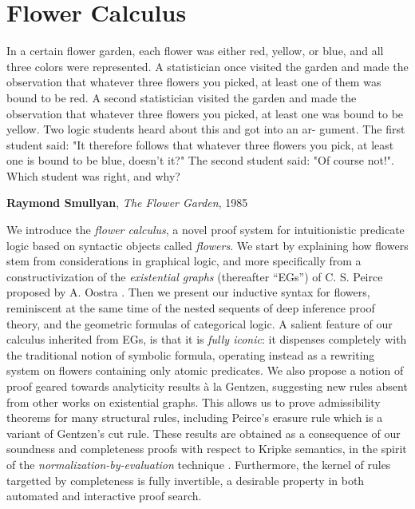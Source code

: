 \setchapterpreamble[u]{\margintoc}
\chapter{Flower Calculus}

\epigraph{In a certain flower garden, each flower was either red, yellow, or
blue, and all three colors were represented. A statistician once visited the
garden and made the observation that whatever three flowers you picked, at least
one of them was bound to be red. A second statistician visited the garden and
made the observation that whatever three flowers you picked, at least one was
bound to be yellow. Two logic students heard about this and got into an ar-
gument. The first student said: "It therefore follows that whatever three
flowers you pick, at least one is bound to be blue, doesn't it?" The second
student said: "Of course not!". Which student was right, and why?
}{\textbf{Raymond Smullyan}, \textit{The Flower Garden}, 1985}

We introduce the \emph{flower calculus}, a novel proof system for intuitionistic
predicate logic based on syntactic objects called \emph{flowers}. We start by
explaining how flowers stem from considerations in graphical logic, and more
specifically from a constructivization of the \emph{existential graphs}
(thereafter ``EGs'') of C. S. Peirce proposed by A. Oostra
. Then we present our inductive syntax
for flowers, reminiscent at the same time of the nested sequents of deep
inference proof theory, and the geometric formulas of categorical logic. A
salient feature of our calculus inherited from EGs, is that it is \emph{fully
iconic}: it dispenses completely with the traditional notion of symbolic
formula, operating instead as a rewriting system on flowers containing only
atomic predicates. We also propose a notion of proof geared towards analyticity
results à la Gentzen, suggesting new rules absent from other works on
existential graphs. This allows us to prove admissibility theorems for many
structural rules, including Peirce's erasure rule which is a variant of
Gentzen's cut rule. These results are obtained as a consequence of our soundness
and completeness proofs with respect to Kripke semantics, in the spirit of the
\emph{normalization-by-evaluation} technique . Furthermore, the
kernel of rules targetted by completeness is fully invertible, a desirable
property in both automated and interactive proof search.

